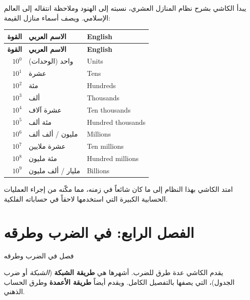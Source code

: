 \documentclass[11pt,a4paper]{book}
\newcommand{\ar}[1]{\arabicfont\beginR #1\endR}
\newcommand{\arLarge}[1]{{\Large\arabicfont\beginR #1\endR}}
\newenvironment{arabicbox}{%
  \begin{framed}
  \begin{minipage}{\linewidth-2\fboxsep-2\fboxrule}
  \setlength{\parindent}{0pt}
  \linespread{1.3}\selectfont
}{%
  \end{minipage}
  \end{framed}
}
\begin{document}
\vspace{0.3cm}

\noindent\ar{يبدأ الكاشي بشرح نظام المنازل العشري، نسبته إلى الهنود وملاحظة انتقاله إلى العالم الإسلامي. ويصف أسماء منازل القيمة:}

\begin{center}
\begin{longtable}{|r|l|l|}
\hline
\textbf{\ar{القوة}} & \textbf{\ar{الاسم العربي}} & \textbf{English} \\
\hline
\endfirsthead
\hline
\textbf{\ar{القوة}} & \textbf{\ar{الاسم العربي}} & \textbf{English} \\
\hline
\endhead
$10^0$ & \ar{واحد} (الوحدات) & Units \\
\hline
$10^1$ & \ar{عشرة} & Tens \\
\hline
$10^2$ & \ar{مئة} & Hundreds \\
\hline
$10^3$ & \ar{ألف} & Thousands \\
\hline
$10^4$ & \ar{عشرة آلاف} & Ten thousands \\
\hline
$10^5$ & \ar{مئة ألف} & Hundred thousands \\
\hline
$10^6$ & \ar{مليون / ألف ألف} & Millions \\
\hline
$10^7$ & \ar{عشرة ملايين} & Ten millions \\
\hline
$10^8$ & \ar{مئة مليون} & Hundred millions \\
\hline
$10^9$ & \ar{مليار / ألف مليون} & Billions \\
\hline
\end{longtable}
\end{center}

\noindent\ar{امتد الكاشي بهذا النظام إلى ما كان شائعاً في زمنه، مما مكّنه من إجراء العمليات الحسابية الكبيرة التي استخدمها لاحقاً في حساباته الفلكية.}

\section{\ar{الفصل الرابع: في الضرب وطرقه}}

\begin{arabicbox}
\begin{center}
\arLarge{فصل في الضرب وطرقه}
\end{center}
\end{arabicbox}

\vspace{0.3cm}

\noindent\ar{يقدم الكاشي عدة طرق للضرب. أشهرها هي \textbf{طريقة الشبكة} (\textit{الشبكة} أو ضرب الجدول)، التي يصفها بالتفصيل الكامل. ويقدم أيضاً \textbf{طريقة الأعمدة} وطرق الحساب الذهني.}
\end{document}
